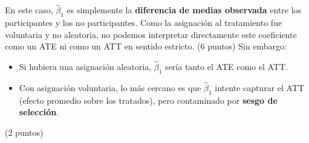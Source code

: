 \documentclass[10pt,a4paper]{article}
\begin{document}
\begin{enumerate}
\begin{enumerate}
    {\color{blue}En este caso, $\hat{\beta}_1$ es simplemente la \textbf{diferencia de medias observada} entre los participantes y los no participantes. 
    Como la asignación al tratamiento fue voluntaria y no aleatoria, no podemos interpretar directamente este coeficiente como un ATE ni como un ATT en sentido estricto.   (6 puntos)
    Sin embargo:
    \begin{itemize}
        \item Si hubiera una asignación aleatoria, $\hat{\beta}_1$ sería tanto el ATE como el ATT.
        \item Con asignación voluntaria, lo más cercano es que $\hat{\beta}_1$ intente capturar el ATT (efecto promedio sobre los tratados), pero contaminado por \textbf{sesgo de selección}.
    \end{itemize}
(2 puntos)    
    }
\end{enumerate}


    







\end{enumerate}
\end{document}
